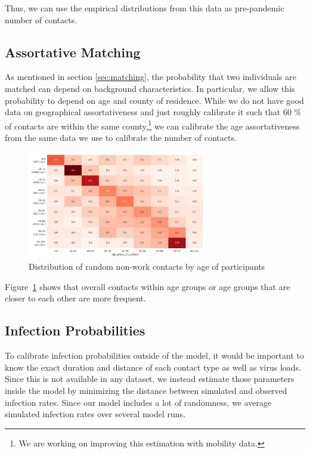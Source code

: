 Thus, we can use the empirical distributions from this data as pre-pandemic number of contacts.


\subsection{Assortative Matching}

As mentioned in section \ref{sec:matching}, the probability that two individuals are matched can depend on background characteristics. In particular, we allow this probability to depend on age and county of residence. While we do not have good data on geographical assortativeness and just roughly calibrate it such that 60 \% of contacts are within the same county,\footnote{We are working on improving this estimation with mobility data.} we can calibrate the age assortativeness from the same data we use to calibrate the number of contacts.

\begin{figure}[!ht]
    \centering
    \includegraphics[width=0.7\textwidth]{../figures/assortative_matching_probability_example.png}
    \caption{Distribution of random non-work contacts by age of participants}
    \label{fig:assortativeness}
\end{figure}

Figure~\ref{fig:assortativeness} shows that overall contacts within age groups or age groups that are closer to each other are more frequent.

\subsection{Infection Probabilities}
\label{sec:estimation}

To calibrate infection probabilities outside of the model, it would be important to know the exact duration and distance of each contact type as well as virus loads. Since this is not available in any dataset, we instead estimate those parameters inside the model by minimizing the distance between simulated and observed infection rates. Since our model includes a lot of randomness, we average simulated infection rates over several model runs.

